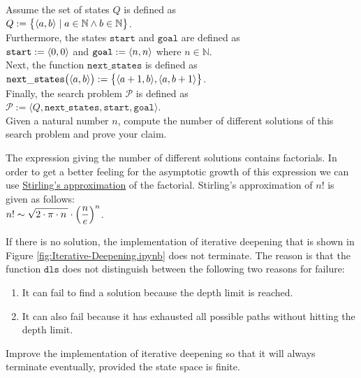 \exercise
Assume the set of states $Q$ is defined as
\\[0.2cm]
\hspace*{1.3cm}
$Q := \bigl\{ \pair(a, b) \mid a \in \mathbb{N} \wedge b \in \mathbb{N} \bigr\}$.
\\[0.2cm]
Furthermore, the states $\texttt{start}$ and $\texttt{goal}$ are defined as
\\[0.2cm]
\hspace*{1.3cm}
$\mathtt{start} := \pair(0,0)$ \quad and \quad $\mathtt{goal} := \pair(n,n)$ where $n \in \mathbb{N}$.
\\[0.2cm]
Next, the function $\texttt{next\_states}$ is defined as
\\[0.2cm]
\hspace*{1.3cm}
$\mathtt{next\_states}\bigl(\pair(a,b)\bigr) := \bigl\{\pair(a+1,b), \pair(a,b+1)\bigr\}$.
\\[0.2cm]
Finally, the search problem $\mathcal{P}$ is defined as
\\[0.2cm]
\hspace*{1.3cm}
$\mathcal{P} := \langle Q, \mathtt{next\_states}, \mathtt{start}, \mathtt{goal} \rangle$.
\\[0.2cm]
Given a natural number $n$, compute the number of different solutions of this search problem and prove
your claim.  

\hint
The expression giving the number of different solutions contains factorials.  In order to get a better feeling
for the asymptotic growth of this expression we can use 
\href{https://en.wikipedia.org/wiki/Stirling%27s_approximation}{Stirling's approximation} of the factorial.
Stirling's approximation of $n!$ is given as follows: 
\\[0.2cm]
\hspace*{1.3cm}
$\displaystyle n! \sim \sqrt{2 \cdot \pi \cdot n\,} \cdot \Bigl(\frac{n}{e}\Bigr)^n$.
\eox

\exercise
If there is no solution, the implementation of iterative deepening that is shown in Figure
\ref{fig:Iterative-Deepening.ipynb} does not terminate.  The reason is that the function $\texttt{dls}$ does not
distinguish between the following two reasons for failure:
\begin{enumerate}
\item It can fail to find a solution because the depth limit is reached.
\item It can also fail because it has exhausted all possible paths without hitting the depth limit.
\end{enumerate}
Improve the implementation of iterative deepening so that it will always terminate eventually, provided the
state space is finite.
\eoxs


